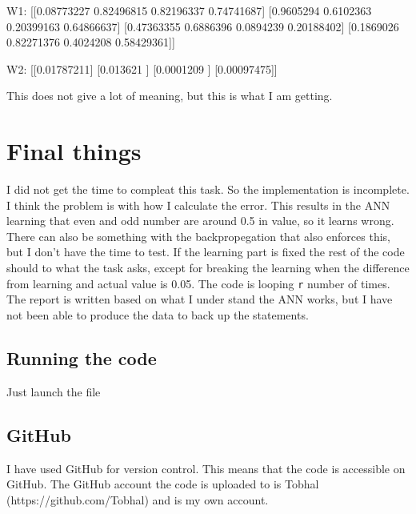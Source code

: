 \documentclass[10pt]{article}
\begin{document}
    \begin{pythoncode}
    W1:
    [[0.08773227 0.82496815 0.82196337 0.74741687]
     [0.9605294  0.6102363  0.20399163 0.64866637]
     [0.47363355 0.6886396  0.0894239  0.20188402]
     [0.1869026  0.82271376 0.4024208  0.58429361]]

    W2:
    [[0.01787211]
     [0.013621  ]
     [0.0001209 ]
     [0.00097475]]
    \end{pythoncode}

    This does not give a lot of meaning, but this is what I am getting.

    \section{Final things}
    I did not get the time to compleat this task. So the implementation is incomplete. I think the problem is with how I calculate the error. This results in the ANN learning that even and odd number are around 0.5 in value, so it learns wrong. There can also be something with the backpropegation that also enforces this, but I don't have the time to test. If the learning part is fixed the rest of the code should to what the task asks, except for breaking the learning when the difference from learning and actual value is 0.05. The code is looping \texttt{r} number of times. The report is written based on what I under stand the ANN works, but I have not been able to produce the data to back up the statements.

    \subsection{Running the code}
    Just launch the file

    \subsection{GitHub}
    I have used GitHub for version control. This means that the code is accessible on GitHub. The GitHub account the code is uploaded to is Tobhal (https://github.com/Tobhal) and is my own account. 
\end{document}
